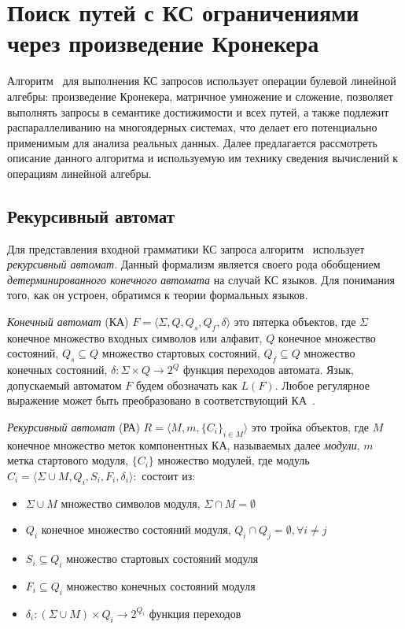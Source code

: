\section{Поиск путей с КС ограничениями через произведение Кронекера}

Алгоритм~\cite{inbook:kronecker_cfpq_adbis} для выполнения КС запросов использует операции булевой линейной  алгебры: произведение Кронекера, матричное умножение и сложение, позволяет выполнять запросы в семантике достижимости и всех путей, а также подлежит распараллеливанию на многоядерных системах, что делает его потенциально применимым для анализа реальных данных. Далее предлагается рассмотреть описание данного алгоритма и используемую им технику сведения вычислений к операциям линейной алгебры.

\subsection{Рекурсивный автомат}

Для представления входной грамматики КС запроса алгоритм~\cite{inbook:kronecker_cfpq_adbis} использует \textit{рекурсивный автомат}. Данный формализм является своего рода обобщением \textit{детерминированного конечного автомата} на случай КС языков. Для понимания того, как он устроен, обратимся к теории формальных языков.

\textit{Конечный автомат} (КА) $F = \langle \Sigma, Q, Q_s, Q_f, \delta \rangle$ это пятерка объектов, где $\Sigma$ конечное множество входных символов или алфавит, $Q$ конечное множество состояний, $Q_s \subseteq Q$ множество стартовых состояний, $Q_f \subseteq Q$ множество конечных состояний, $\delta : \Sigma \times Q \rightarrow 2^Q$ функция переходов автомата. Язык, допускаемый автоматом $F$ будем обозначать как $L(F)$. Любое регулярное выражение может быть преобразовано в соответствующий КА~\cite{book:automata_theory}. 

\textit{Рекурсивный автомат} (РА) $R = \langle M, m, \{C_i\}_{i \in M} \rangle$ это тройка объектов, где $M$ конечное множество меток компонентных КА, называемых далее \textit{модули}, $m$ метка стартового модуля, $\{C_i\}$ множество модулей, где модуль $C_i = \langle \Sigma \cup M, Q_i, S_i, F_i, \delta _i \rangle: $ состоит из:

\begin{itemize}
    \item $\Sigma \cup M$ множество символов модуля, $\Sigma \cap M = \emptyset$
    \item $Q_i$ конечное множество состояний модуля, $Q_i \cap Q_j = \emptyset, \forall i \neq j$
    \item $S_i \subseteq Q_i$ множество стартовых состояний модуля
    \item $F_i \subseteq Q_i$ множество конечных состояний модуля 
    \item $\delta_i : (\Sigma \cup M) \times Q_i \rightarrow 2^{Q_i}$ функция переходов
\end{itemize}

